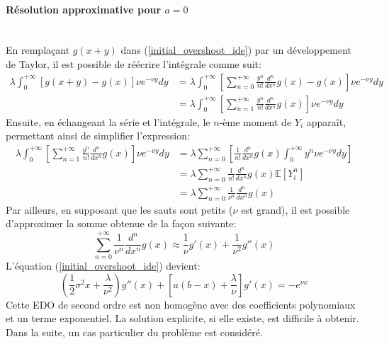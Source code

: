 \paragraph{Résolution approximative pour $a=0$}\phantom{}\\
En remplaçant $g(x+y)$ dans (\ref{initial_overshoot_ide}) par un développement de Taylor, il est possible de réécrire l'intégrale comme suit:
\[
\begin{aligned}
    \lambda\int_0^{+\infty}\left[g(x+y)-g(x)\right]\nu e^{-\nu y}dy&=\lambda\int_0^{+\infty}\left[\sum_{n=0}^{+\infty}\frac{y^n}{n!}\frac{d^n}{dx^n}g(x)-g(x)\right]\nu e^{-\nu y}dy\\
    &=\lambda\int_0^{+\infty}\left[\sum_{n=1}^{+\infty}\frac{y^n}{n!}\frac{d^n}{dx^n}g(x)\right]\nu e^{-\nu y}dy
\end{aligned}
\]
Ensuite, en échangeant la série et l'intégrale, le $n$-ème moment de $Y_i$ apparaît, permettant ainsi de simplifier l'expression:
\[
\begin{aligned}
    \lambda\int_0^{+\infty}\left[\sum_{n=1}^{+\infty}\frac{y^n}{n!}\frac{d^n}{dx^n}g(x)\right]\nu e^{-\nu y}dy&=\lambda\sum_{n=0}^{+\infty}\left[\frac{1}{n!}\frac{d^n}{dx^n}g(x)\int_0^{+\infty}y^n\nu e^{-\nu y}dy\right]\\
    &=\lambda\sum_{n=0}^{+\infty}\frac{1}{n!}\frac{d^n}{dx^n}g(x)\mathds{E}\left[Y_i^n\right]\\
    &=\lambda\sum_{n=0}^{+\infty}\frac{1}{\nu^n}\frac{d^n}{dx^n}g(x)
\end{aligned}
\]
Par ailleurs, en supposant que les sauts sont petits ($\nu$ est grand), il est possible d'approximer la somme obtenue de la façon suivante:
\[
\sum_{n=0}^{+\infty}\frac{1}{\nu^n}\frac{d^n}{dx^n}g(x)\approx\frac{1}{\nu}g'(x)+\frac{1}{\nu^2}g''(x)
\]
L'équation (\ref{initial_overshoot_ide}) devient:
\begin{equation}\label{final_overshoot_ode}
    \left(\frac{1}{2}\sigma^2x+\frac{\lambda}{\nu^2}\right)g''(x)+\left[a(b-x)+\frac{\lambda}{\nu}\right]g'(x) =-e^{\nu x}
\end{equation}
Cette \acs{EDO} de second ordre est non homogène avec des coefficients polynomiaux et un terme exponentiel. La solution explicite, si elle existe, est difficile à obtenir. Dans la suite, un cas particulier du problème est considéré.

